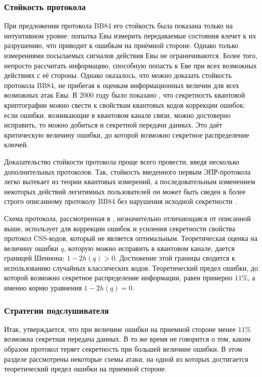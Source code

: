\subsubsection{Стойкость протокола}
При предложении протокола BB84 его стойкость была показана только на интуитивном уровне: попытка Евы измерить передаваемые состояния влечет к их разрушению, что приводит к ошибкам на приёмной стороне.
Однако только измерениями посылаемых сигналов действия Евы не ограничиваются. Более того, непросто рассчитать информацию, способную попасть к Еве при всех возможных действиях с её стороны. Однако оказалось, что можно доказать стойкость протокола BB84, не прибегая к оценкам информационных величин для всех возможных атак Евы. В 2000 году было показано \cite{shor_bb84_security_proof}, что секретность квантовой криптографии можно свести к свойствам квантовых кодов коррекции ошибок: если ошибки, возникающие в квантовом канале связи, можно достоверно исправить, то можно добиться и секретной передачи данных. Это даёт критическую величину ошибки, до которой возможно секретное распределение ключей. 

Доказательство стойкости протокола проще всего провести, введя несколько дополнительных протоколов. Так, стойкость введенного первым ЭПР-протокола \cite{e91} легко вытекает из теории квантовых измерений, а последовательным изменением некоторых действий легитимных пользователей он может быть сведен к более строго описанному протоколу BB84 без нарушения исходной секретности \cite{lo_chau, protocol_css}.

Схема протокола, рассмотренная в \cite{protocol_css}, незначительно отличающаяся от описанной выше, использует для коррекции ошибок и усиления секретности свойства протокол CSS-кодов, который не является оптимальным. Теоретическая оценка на величину ошибки $q$, которую можно исправить в квантовом канале, дается границей Шеннона: $1-2h(q) > 0$. 
Достижение этой границы сводится к использованию случайных классических кодов. Теоретический предел ошибки, до которой возможно секретное распределение информации, равен примерно $11\%$, а именно корню уравнения $1 - 2h(q) = 0$.

\subsubsection{Стратегии подслушивателя}
Итак, утверждается, что при величине ошибки на приемной стороне менее $11\%$ возможна секретная передача данных. В то же время не говорится о том, каким образом протокол теряет секретность при большей величине ошибки. В этом разделе рассмотрены некоторые схемы атаки, на одной из которых достигается теоретический предел ошибки на приемной стороне.
